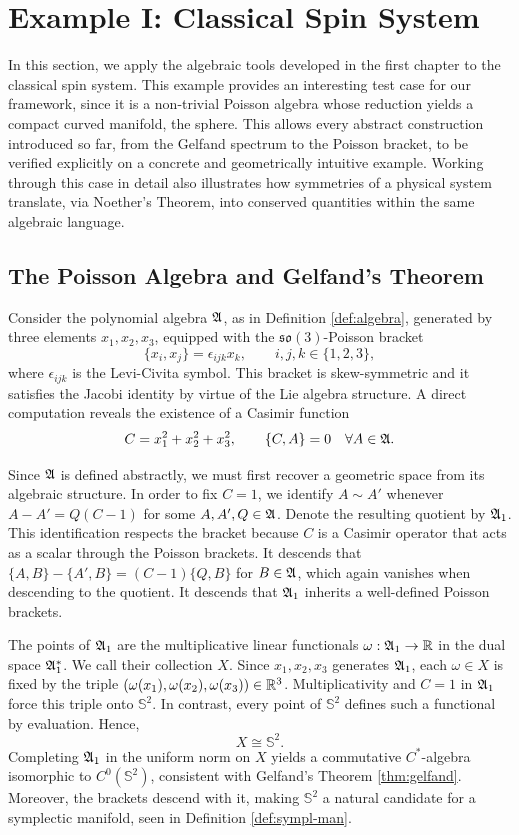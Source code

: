 	\section{Example I: Classical Spin System}\label{sec:1-example}
	In this section, we apply the algebraic tools developed in the first chapter to the classical spin system. This example provides an interesting test case for our framework, since it is a non-trivial Poisson algebra whose reduction yields a compact curved manifold, the sphere. This allows every abstract construction introduced so far, from the Gelfand spectrum to the Poisson bracket, to be verified explicitly on a concrete and geometrically intuitive example. Working through this case in detail also illustrates how symmetries of a physical system translate, via Noether's Theorem, into conserved quantities within the same algebraic language.
	
	\subsection*{The Poisson Algebra and Gelfand's Theorem}
	
	Consider the polynomial algebra \(\mathfrak{A} \), as in Definition \ref{def:algebra}, generated by three elements \(x_1, x_2, x_3\), equipped with the \(\mathfrak{so}(3)\)-Poisson bracket
	\[
	\{x_i, x_j\} = \epsilon_{ijk} x_k, \qquad i,j,k \in \{1,2,3\},
	\]
	where \(\epsilon_{ijk}\) is the Levi-Civita symbol. This bracket is skew-symmetric and it satisfies the Jacobi identity by virtue of the Lie algebra structure. A direct computation reveals the existence of a Casimir function
	\[
	C = x_1^2 + x_2^2 + x_3^2, \qquad \{C, A\} = 0 \quad \forall A \in \mathfrak{A}.
	\]
	
	Since $\mathfrak{A}$ is defined abstractly, we must first recover a geometric space from its algebraic structure. In order to fix \(C=1\), we identify \(A \sim A'\) whenever \(A-A' = Q(C-1)\) for some \(A, A', Q \in \mathfrak{A}\). Denote the resulting quotient by \(\mathfrak{A}_1\). This identification respects the bracket because \(C\) is a Casimir operator that acts as a scalar through the Poisson brackets. It descends that \(\{A,B\}-\{A',B\} = (C-1)\{Q,B\}\) for $B \in \mathfrak{A}$, which again vanishes when descending to the quotient. It descends that \(\mathfrak{A}_1\) inherits a well-defined Poisson brackets.
	
	The points of \(\mathfrak{A}_1\) are the multiplicative linear functionals \(\omega:\mathfrak{A}_1\to\mathbb{R}\) in the dual space \(\mathfrak{A}_1^*\). We call their collection \(X\). Since \(x_1,x_2,x_3\) generates \(\mathfrak{A}_1\), each \(\omega\in X\) is fixed by the triple \((\omega(x_1),\omega(x_2),\omega(x_3))\in\mathbb{R}^3\). Multiplicativity and \(C=1\) in \(\mathfrak{A}_1\) force this triple onto \(\mathbb S^2\). In contrast, every point of \(\mathbb S^2\) defines such a functional by evaluation. Hence,
	\[
	X \cong \mathbb{S}^2.
	\]
	Completing \(\mathfrak{A}_1\) in the uniform norm on \(X\) yields a commutative $C^*$-algebra isomorphic to \(C^0(\mathbb S^2)\), consistent with Gelfand's Theorem \ref{thm:gelfand}. Moreover, the brackets descend with it, making \(\mathbb S^2\) a natural candidate for a symplectic manifold, seen in Definition \ref{def:sympl-man}.
	
